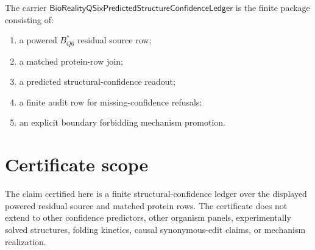 \begin{definition}
The carrier $\mathsf{BioRealityQSixPredictedStructureConfidenceLedger}$ is the finite package consisting of:
\begin{enumerate}
\item a powered $B^*_{Q6}$ residual source row;
\item a matched protein-row join;
\item a predicted structural-confidence readout;
\item a finite audit row for missing-confidence refusals;
\item an explicit boundary forbidding mechanism promotion.
\end{enumerate}
\end{definition}

\section{Certificate scope}

The claim certified here is a finite structural-confidence ledger over the displayed powered residual source and matched protein rows. The certificate does not extend to other confidence predictors, other organism panels, experimentally solved structures, folding kinetics, causal synonymous-edit claims, or mechanism realization.

\begin{closurestatus}{\BioRealityQSixPredictedStructureConfidenceLedgerUp}
  \theoryclosure{\seedClosure}
  \formalstatus{\unformalizedV}
\end{closurestatus}
